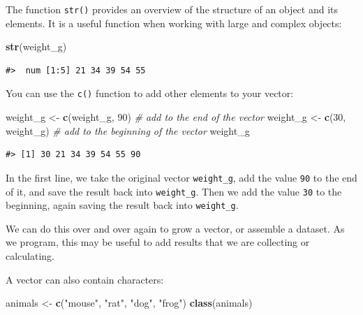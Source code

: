 \documentclass[
]{book}
\newenvironment{Shaded}{\begin{snugshade}}{\end{snugshade}}
\newcommand{\CommentTok}[1]{\textcolor[rgb]{0.56,0.35,0.01}{\textit{#1}}}
\newcommand{\DecValTok}[1]{\textcolor[rgb]{0.00,0.00,0.81}{#1}}
\newcommand{\KeywordTok}[1]{\textcolor[rgb]{0.13,0.29,0.53}{\textbf{#1}}}
\newcommand{\NormalTok}[1]{#1}
\newcommand{\StringTok}[1]{\textcolor[rgb]{0.31,0.60,0.02}{#1}}
\begin{document}
The function \texttt{str()} provides an overview of the structure of an object and its
elements. It is a useful function when working with large and complex
objects:

\begin{Shaded}
\begin{Highlighting}[]
\KeywordTok{str}\NormalTok{(weight_g)}
\end{Highlighting}
\end{Shaded}

\begin{verbatim}
#>  num [1:5] 21 34 39 54 55
\end{verbatim}

You can use the \texttt{c()} function to add other elements to your vector:

\begin{Shaded}
\begin{Highlighting}[]
\NormalTok{weight_g <-}\StringTok{ }\KeywordTok{c}\NormalTok{(weight_g, }\DecValTok{90}\NormalTok{) }\CommentTok{# add to the end of the vector}
\NormalTok{weight_g <-}\StringTok{ }\KeywordTok{c}\NormalTok{(}\DecValTok{30}\NormalTok{, weight_g) }\CommentTok{# add to the beginning of the vector}
\NormalTok{weight_g}
\end{Highlighting}
\end{Shaded}

\begin{verbatim}
#> [1] 30 21 34 39 54 55 90
\end{verbatim}

In the first line, we take the original vector \texttt{weight\_g},
add the value \texttt{90} to the end of it, and save the result back into
\texttt{weight\_g}. Then we add the value \texttt{30} to the beginning, again saving the result
back into \texttt{weight\_g}.

We can do this over and over again to grow a vector, or assemble a dataset.
As we program, this may be useful to add results that we are collecting or
calculating.

A vector can also contain characters:

\begin{Shaded}
\begin{Highlighting}[]
\NormalTok{animals <-}\StringTok{ }\KeywordTok{c}\NormalTok{(}\StringTok{"mouse"}\NormalTok{, }\StringTok{"rat"}\NormalTok{, }\StringTok{"dog"}\NormalTok{, }\StringTok{"frog"}\NormalTok{)}
\KeywordTok{class}\NormalTok{(animals)}
\end{Highlighting}
\end{Shaded}
\end{document}
